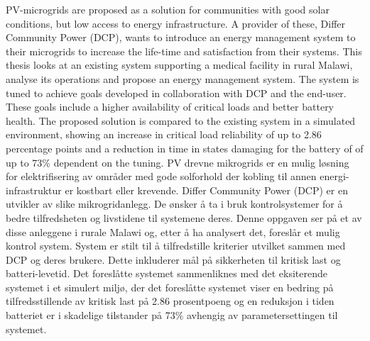 PV-microgrids are proposed as a solution for communities with good solar conditions, but low access to energy infrastructure. A provider of these, Differ Community Power (DCP), wants to introduce an energy management system to their microgrids to increase the life-time and satisfaction from their systems. This thesis looks at an existing system supporting a medical facility in rural Malawi, analyse its operations and propose an energy management system. The system is tuned to achieve goals developed in collaboration with DCP and the end-user. These goals include a higher availability of critical loads and better battery health. The proposed solution is compared to the existing system in a simulated environment, showing an increase in critical load reliability of up to 2.86 percentage points and a reduction in time in states damaging for the battery of of up to 73\% dependent on the tuning. 
\newline
\newline
\newline
PV drevne mikrogrids er en mulig løsning for elektrifisering av områder med gode solforhold der kobling til annen energi-infrastruktur er kostbart eller krevende. Differ Community Power (DCP) er en utvikler av slike mikrogridanlegg. De ønsker å ta i bruk kontrolsystemer for å bedre tilfredsheten og livstidene til systemene deres. Denne oppgaven ser på et av disse anleggene i rurale Malawi og, etter å ha analysert det, foreslår et mulig kontrol system. System er stilt til å tilfredstille kriterier utvilket sammen med DCP og deres brukere. Dette inkluderer mål på sikkerheten til kritisk last og batteri-levetid. Det foreslåtte systemet sammenliknes med det eksiterende systemet i et simulert miljø, der det foreslåtte systemet viser en bedring på tilfredsstillende av kritisk last på 2.86 prosentpoeng og en reduksjon i tiden batteriet er i skadelige tilstander på 73\% avhengig av parametersettingen til systemet. 




